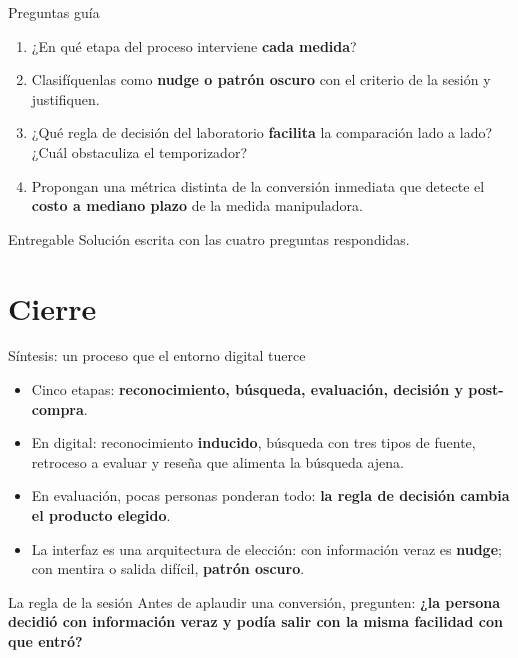 \documentclass[aspectratio=169,xcolor=dvipsnames]{beamer}
\begin{document}
\begin{frame}{Preguntas guía}
\small
\begin{enumerate}
  \item ¿En qué etapa del proceso interviene \textbf{cada medida}?
  \vspace{3pt}
  \item Clasifíquenlas como \textbf{nudge o patrón oscuro} con el criterio de la sesión y justifiquen.
  \vspace{3pt}
  \item ¿Qué regla de decisión del laboratorio \textbf{facilita} la comparación lado a lado? ¿Cuál obstaculiza el temporizador?
  \vspace{3pt}
  \item Propongan una métrica distinta de la conversión inmediata que detecte el \textbf{costo a mediano plazo} de la medida manipuladora.
\end{enumerate}
\begin{alertblock}{Entregable}
  \small Solución escrita con las cuatro preguntas respondidas.
\end{alertblock}
\end{frame}

\section{Cierre}

\begin{frame}{Síntesis: un proceso que el entorno digital tuerce}
\begin{itemize}
  \small
  \item Cinco etapas: \textbf{reconocimiento, búsqueda, evaluación, decisión y post-compra}.
  \item En digital: reconocimiento \textbf{inducido}, búsqueda con tres tipos de fuente, retroceso a evaluar y reseña que alimenta la búsqueda ajena.
  \item En evaluación, pocas personas ponderan todo: \textbf{la regla de decisión cambia el producto elegido}.
  \item La interfaz es una arquitectura de elección: con información veraz es \textbf{nudge}; con mentira o salida difícil, \textbf{patrón oscuro}.
\end{itemize}
\vspace{4pt}
\begin{alertblock}{La regla de la sesión}
  \small Antes de aplaudir una conversión, pregunten: \textbf{¿la persona decidió con información veraz y podía salir con la misma facilidad con que entró?}
\end{alertblock}
\end{frame}
\end{document}
